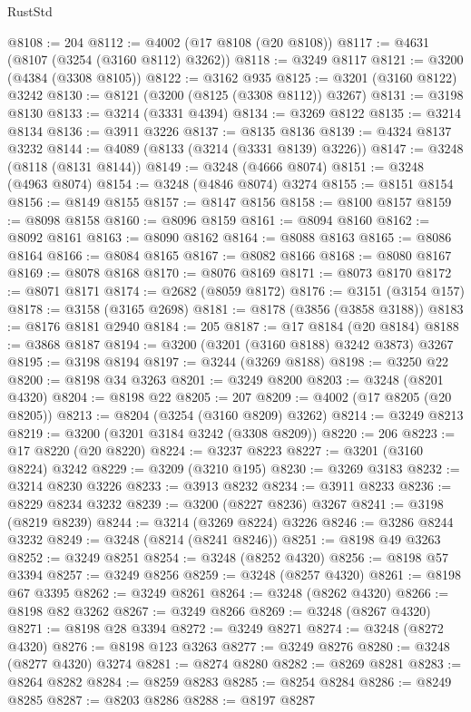 \begin{lexlean}{RustStd}
\begin{coremodule}
{\begin{coremodule}
{{{{{{{{{{{{{{{{{{{{{{{{{@8108 := 204
@8112 := @4002 (@17 @8108 (@20 @8108))
@8117 := @4631 (@8107 (@3254 (@3160 @8112) @3262))
@8118 := @3249 @8117
@8121 := @3200 (@4384 (@3308 @8105))
@8122 := @3162 @935
@8125 := @3201 (@3160 @8122) @3242
@8130 := @8121 (@3200 (@8125 (@3308 @8112)) @3267)
@8131 := @3198 @8130
@8133 := @3214 (@3331 @4394)
@8134 := @3269 @8122
@8135 := @3214 @8134
@8136 := @3911 @3226
@8137 := @8135 @8136
@8139 := @4324 @8137 @3232
@8144 := @4089 (@8133 (@3214 (@3331 @8139) @3226))
@8147 := @3248 (@8118 (@8131 @8144))
@8149 := @3248 (@4666 @8074)
@8151 := @3248 (@4963 @8074)
@8154 := @3248 (@4846 @8074) @3274
@8155 := @8151 @8154
@8156 := @8149 @8155
@8157 := @8147 @8156
@8158 := @8100 @8157
@8159 := @8098 @8158
@8160 := @8096 @8159
@8161 := @8094 @8160
@8162 := @8092 @8161
@8163 := @8090 @8162
@8164 := @8088 @8163
@8165 := @8086 @8164
@8166 := @8084 @8165
@8167 := @8082 @8166
@8168 := @8080 @8167
@8169 := @8078 @8168
@8170 := @8076 @8169
@8171 := @8073 @8170
@8172 := @8071 @8171
@8174 := @2682 (@8059 @8172)
@8176 := @3151 (@3154 @157)
@8178 := @3158 (@3165 @2698)
@8181 := @8178 (@3856 (@3858 @3188))
@8183 := @8176 @8181 @2940
@8184 := 205
@8187 := @17 @8184 (@20 @8184)
@8188 := @3868 @8187
@8194 := @3200 (@3201 (@3160 @8188) @3242 @3873) @3267
@8195 := @3198 @8194
@8197 := @3244 (@3269 @8188)
@8198 := @3250 @22
@8200 := @8198 @34 @3263
@8201 := @3249 @8200
@8203 := @3248 (@8201 @4320)
@8204 := @8198 @22
@8205 := 207
@8209 := @4002 (@17 @8205 (@20 @8205))
@8213 := @8204 (@3254 (@3160 @8209) @3262)
@8214 := @3249 @8213
@8219 := @3200 (@3201 @3184 @3242 (@3308 @8209))
@8220 := 206
@8223 := @17 @8220 (@20 @8220)
@8224 := @3237 @8223
@8227 := @3201 (@3160 @8224) @3242
@8229 := @3209 (@3210 @195)
@8230 := @3269 @3183
@8232 := @3214 @8230 @3226
@8233 := @3913 @8232
@8234 := @3911 @8233
@8236 := @8229 @8234 @3232
@8239 := @3200 (@8227 @8236) @3267
@8241 := @3198 (@8219 @8239)
@8244 := @3214 (@3269 @8224) @3226
@8246 := @3286 @8244 @3232
@8249 := @3248 (@8214 (@8241 @8246))
@8251 := @8198 @49 @3263
@8252 := @3249 @8251
@8254 := @3248 (@8252 @4320)
@8256 := @8198 @57 @3394
@8257 := @3249 @8256
@8259 := @3248 (@8257 @4320)
@8261 := @8198 @67 @3395
@8262 := @3249 @8261
@8264 := @3248 (@8262 @4320)
@8266 := @8198 @82 @3262
@8267 := @3249 @8266
@8269 := @3248 (@8267 @4320)
@8271 := @8198 @28 @3394
@8272 := @3249 @8271
@8274 := @3248 (@8272 @4320)
@8276 := @8198 @123 @3263
@8277 := @3249 @8276
@8280 := @3248 (@8277 @4320) @3274
@8281 := @8274 @8280
@8282 := @8269 @8281
@8283 := @8264 @8282
@8284 := @8259 @8283
@8285 := @8254 @8284
@8286 := @8249 @8285
@8287 := @8203 @8286
@8288 := @8197 @8287
}}}}}}}}}}}}}}}}}}}}}}}}}
\end{coremodule}}
\end{coremodule}
\end{lexlean}
